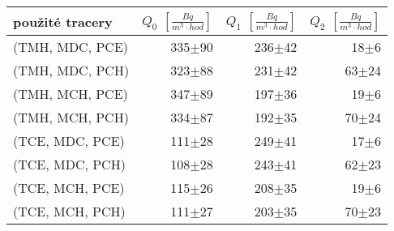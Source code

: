 \begin{tabular}{lrrr}
\toprule
použité tracery & $Q_0$ $\left[\si{\frac{Bq}{m^3\cdot hod}}\right]$ & $Q_1$ $\left[\si{\frac{Bq}{m^3\cdot hod}}\right]$ & $Q_2$ $\left[\si{\frac{Bq}{m^3\cdot hod}}\right]$ \\
\midrule
(TMH, MDC, PCE) &                                          335$\pm$90 &                                          236$\pm$42 &                                            18$\pm$6 \\
(TMH, MDC, PCH) &                                          323$\pm$88 &                                          231$\pm$42 &                                           63$\pm$24 \\
(TMH, MCH, PCE) &                                          347$\pm$89 &                                          197$\pm$36 &                                            19$\pm$6 \\
(TMH, MCH, PCH) &                                          334$\pm$87 &                                          192$\pm$35 &                                           70$\pm$24 \\
(TCE, MDC, PCE) &                                          111$\pm$28 &                                          249$\pm$41 &                                            17$\pm$6 \\
(TCE, MDC, PCH) &                                          108$\pm$28 &                                          243$\pm$41 &                                           62$\pm$23 \\
(TCE, MCH, PCE) &                                          115$\pm$26 &                                          208$\pm$35 &                                            19$\pm$6 \\
(TCE, MCH, PCH) &                                          111$\pm$27 &                                          203$\pm$35 &                                           70$\pm$23 \\
\bottomrule
\end{tabular}
